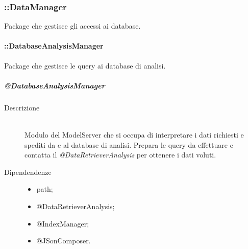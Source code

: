 \subsubsection{::DataManager}
Package che gestisce gli accessi ai database.

\paragraph{::DatabaseAnalysisManager} \hfill 
Package che gestisce le query ai database di analisi. 

\subparagraph{@DatabaseAnalysisManager}
\begin{description}
 \item[Descrizione] \hfill \\
Modulo del ModelServer che si occupa di interpretare i dati richiesti e spediti da e al database di analisi. 
Prepara le query da effettuare e contatta il \textit{@DataRetrieverAnalysis} per ottenere i dati voluti.
 \item[Dipendendenze] \hfill
 \begin{itemize}
  \item path;
  \item @DataRetrieverAnalysis;
  \item @IndexManager;
  \item @JSonComposer.
 \end{itemize}
 
 

\end{description}

